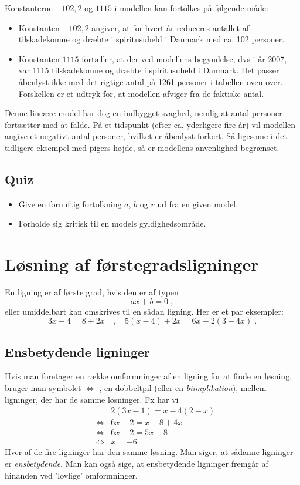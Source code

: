 \documentclass[12pt,oneside,a4paper]{article}
\newcommand{\bas}{\begin{eqnarray*}}
\newcommand{\eas}{\end{eqnarray*}}
\begin{document}
Konstanterne $-102,2$ og $1115$ i modellen kan fortolkes på følgende måde:
\begin{itemize}
    \item Konstanten $-102,2$ angiver, at for hvert år reduceres antallet
        af tilskadekomne og dræbte i spiritusuheld i Danmark med ca. 102 personer.
    \item Konstanten $1115$ fortæller, at der ved modellens begyndelse, dvs i år 2007,
        var 1115 tilskadekomne og dræbte i spiritusuheld i Danmark. Det passer åbenlyst
        ikke med det rigtige antal på 1261 personer i tabellen oven over. Forskellen er
        et udtryk for, at modellen afviger fra de faktiske antal.
\end{itemize}

Denne lineære model har dog en indbygget svaghed, nemlig at antal personer fortsætter med at falde.
På et tidspunkt (efter ca. yderligere fire år) vil modellen angive et negativt antal personer, hvilket 
er åbenlyst forkert. Så ligesome i det tidligere eksempel med pigers højde, så er modellens
anvenlighed begrænset.

\subsection{Quiz}
\begin{itemize}
    \item Give en fornuftig fortolkning $a$, $b$ og $r$ ud fra en given model.
    \item Forholde sig kritisk til en models gyldighedsområde.
\end{itemize}


\section{Løsning af førstegradsligninger}
En ligning er af første grad, hvis den er af typen
$$
ax + b = 0\; ,
$$
eller umiddelbart kan omskrives til en sådan ligning. Her er et par eksempler:
$$
3x - 4 = 8 + 2x \quad , \quad 5(x - 4) + 2x = 6x - 2(3 - 4x)\; .
$$

\subsection{Ensbetydende ligninger}
Hvis man foretager en række omformninger af en ligning for at finde en løsning,
bruger man symbolet $\Leftrightarrow$ , en dobbeltpil (eller en {\em
biimplikation}), mellem ligninger, der har de samme løsninger. Fx har vi
\bas
&& 2(3x - 1) = x - 4(2 - x)\\
&\Leftrightarrow& 6x - 2 = x - 8 + 4x\\
&\Leftrightarrow& 6x - 2 = 5x - 8 \\
&\Leftrightarrow& x = -6 
\eas
Hver af de fire ligninger har den samme løsning. Man siger, at sådanne
ligninger er {\em ensbetydende}. Man kan også sige, at ensbetydende ligninger
fremgår af hinanden ved ’lovlige’ omformninger.
\end{document}
